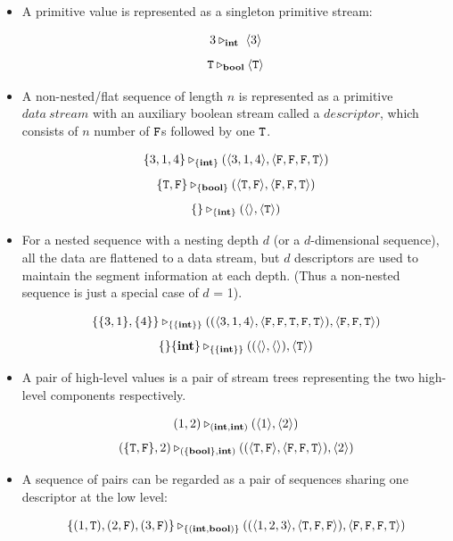 \begin{itemize}
	\item A primitive value is represented as a singleton primitive stream: 
	\begin{example}
		$$3 \tr_\int \ \< 3 \'>$$
		$$ \mathtt{T} \triangleright_{\mathbf{bool}} \langle \mathtt{T} \rangle $$
	\end{example}
	
	
	\item A non-nested/flat sequence of length $n$ is represented as a primitive $data \ stream$ with an auxiliary boolean stream called a $descriptor$, which consists of $n$ number of $\mathtt{F}$s followed by one $\mathtt{T}$. 
	\begin{example}
		$$\{3,1,4\} \tr_{\{\int\}} (\< 3,1,4 \'>, \< \F, \F,\F , \T \'>) $$
		$$\{\T,\F\} \tr_{\{\bool\}} (\< \T,\F\'>, \< \F,\F , \T \'>) $$
		$$\{\} \triangleright_{\{\mathbf{int} \}} (\langle \rangle, \langle \mathtt{T} \rangle)$$
	\end{example}
	
	\item For a nested sequence with a nesting depth $d$ (or a $d$-dimensional sequence), all the data are flattened to a data stream, but $d$ descriptors are used to maintain the segment information at each depth. 
	(Thus a non-nested sequence is just a special case of $d$ = 1).
	
	\begin{example}
		$$\{\{3,1\}, \{4\}\} \tr_{\{\{\int\}\}} ((\< 3,1,4 \'>, \<\F,\F,\T,\F,\T \'>),\< \F, \F, \T \'>)  $$		
		$$\{\}\{\mathbf{int}\} \triangleright_{\{\{\mathbf{int}\}\}} ((\langle \rangle, \langle \rangle), \langle \mathtt{T} \rangle)$$
	\end{example}

	
	\item A pair of high-level values is a pair of stream trees representing the two high-level components respectively.  
	\begin{example}
		$$(1,2) \triangleright_{(\mathbf{int},\mathbf{int})} (\langle 1 \rangle, \langle 2 \rangle)$$
		$$(\{\T,\F\},2) \tr_{(\{\bool\},\int)} ((\< \T, \F \'>, \< \F,\F,\T \'>),\singl{2})$$
	\end{example} 
	
	\item A sequence of pairs can be regarded as a pair of sequences sharing one descriptor at the low level:
	\begin{example}
		$$\{(1,\T),(2,\F),(3,\F)\} \tr_{\{(\int,\bool)\}} ((\<1,2,3\'>, \<\T,\F, \F\'>), \< \F,\F,\F,\T \'>)$$
	\end{example}
	
	
\end{itemize}


